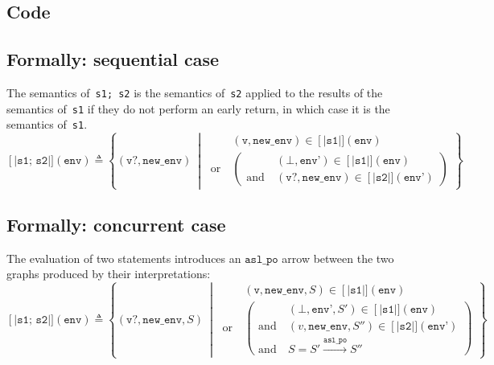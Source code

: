 \documentclass{book}
\newcommand\llbracket{[|}
\newcommand\rrbracket{|]}
\newcommand\interp[1]{\left\llbracket #1 \right\rrbracket}
\newcommand\st[0]{\ \middle|\ }
\newcommand\aslpo[0]{\mathtt{asl\_po}}
\begin{document}
  \subsection{Code}

  \subsection{Formally: sequential case}
  The semantics of~\texttt{s1; s2} is the semantics of~\texttt{s2} applied to the results
  of the semantics of~\texttt{s1} if they do not perform an early return, in which
  case it is the semantics of~\texttt{s1}.
  \begin{equation}
    \interp{\texttt{s1; s2}} (\texttt{env}) \triangleq
      \left\{ (\texttt{v?}, \texttt{new\_env}) \st{}
      \begin{aligned}
        & (\texttt{v}, \texttt{new\_env}) \in \interp{\texttt{s1}} (\texttt{env})
        \\ \text{or}\ &
        \left(
        \begin{aligned}
            & (\bot{}, \texttt{env'}) \in \interp{\texttt{s1}} (\texttt{env})
            \\ \text{and}\ &
            (\texttt{v?}, \texttt{new\_env}) \in \interp{\texttt{s2}} (\texttt{env'})
        \end{aligned}
        \right)
      \end{aligned}
      \right\}
    \label{eq:sem-seq-sseq}
  \end{equation}

  \subsection{Formally: concurrent case}
  The evaluation of two statements introduces an $\aslpo$ arrow between the two
graphs produced by their interpretations:
  \begin{equation}
    \interp{\texttt{s1; s2}} (\texttt{env}) \triangleq
      \left\{ (\texttt{v?}, \texttt{new\_env}, S) \st{}
      \begin{aligned}
        & (\texttt{v}, \texttt{new\_env}, S) \in \interp{\texttt{s1}} (\texttt{env})
        \\ \text{or}\ &
        \left(
        \begin{aligned}
            & (\bot{}, \texttt{env'}, S') \in \interp{\texttt{s1}} (\texttt{env})
            \\ \text{and}\ &
            (v, \texttt{new\_env}, S'') \in \interp{\texttt{s2}} (\texttt{env'})
            \\ \text{and}\ &
            S = S' \xrightarrow{\aslpo} S''
        \end{aligned}
        \right)
      \end{aligned}
      \right\}
    \label{eq:sem-conc-sseq}
  \end{equation}
\end{document}
